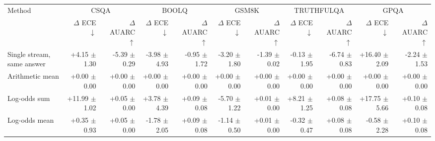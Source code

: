 \begin{tabular}{lrrrrrrrrrr}
\toprule
Method & \multicolumn{2}{c}{CSQA} & \multicolumn{2}{c}{BOOLQ} & \multicolumn{2}{c}{GSM8K} & \multicolumn{2}{c}{TRUTHFULQA} & \multicolumn{2}{c}{GPQA} \\
 & $\Delta$ ECE $\downarrow$ & $\Delta$ AUARC $\uparrow$ & $\Delta$ ECE $\downarrow$ & $\Delta$ AUARC $\uparrow$ & $\Delta$ ECE $\downarrow$ & $\Delta$ AUARC $\uparrow$ & $\Delta$ ECE $\downarrow$ & $\Delta$ AUARC $\uparrow$ & $\Delta$ ECE $\downarrow$ & $\Delta$ AUARC $\uparrow$ \\
\midrule
Single stream, same answer & +4.15 {\scriptsize $\pm$ 1.30} & -5.39 {\scriptsize $\pm$ 0.29} & -3.98 {\scriptsize $\pm$ 4.93} & -0.95 {\scriptsize $\pm$ 1.72} & -3.20 {\scriptsize $\pm$ 1.80} & -1.39 {\scriptsize $\pm$ 0.02} & -0.13 {\scriptsize $\pm$ 1.95} & -6.74 {\scriptsize $\pm$ 0.83} & +16.40 {\scriptsize $\pm$ 2.09} & -2.24 {\scriptsize $\pm$ 1.53} \\
Arithmetic mean & +0.00 {\scriptsize $\pm$ 0.00} & +0.00 {\scriptsize $\pm$ 0.00} & +0.00 {\scriptsize $\pm$ 0.00} & +0.00 {\scriptsize $\pm$ 0.00} & +0.00 {\scriptsize $\pm$ 0.00} & +0.00 {\scriptsize $\pm$ 0.00} & +0.00 {\scriptsize $\pm$ 0.00} & +0.00 {\scriptsize $\pm$ 0.00} & +0.00 {\scriptsize $\pm$ 0.00} & +0.00 {\scriptsize $\pm$ 0.00} \\
Log-odds sum & +11.99 {\scriptsize $\pm$ 1.02} & +0.05 {\scriptsize $\pm$ 0.00} & +3.78 {\scriptsize $\pm$ 4.39} & +0.09 {\scriptsize $\pm$ 0.08} & -5.70 {\scriptsize $\pm$ 1.22} & +0.01 {\scriptsize $\pm$ 0.00} & +8.21 {\scriptsize $\pm$ 1.25} & +0.08 {\scriptsize $\pm$ 0.08} & +17.75 {\scriptsize $\pm$ 5.66} & +0.10 {\scriptsize $\pm$ 0.08} \\
Log-odds mean & +0.35 {\scriptsize $\pm$ 0.93} & +0.05 {\scriptsize $\pm$ 0.00} & -1.78 {\scriptsize $\pm$ 2.05} & +0.09 {\scriptsize $\pm$ 0.08} & -1.14 {\scriptsize $\pm$ 0.50} & +0.01 {\scriptsize $\pm$ 0.00} & -0.32 {\scriptsize $\pm$ 0.47} & +0.08 {\scriptsize $\pm$ 0.08} & -0.58 {\scriptsize $\pm$ 2.28} & +0.10 {\scriptsize $\pm$ 0.08} \\

\end{tabular}
